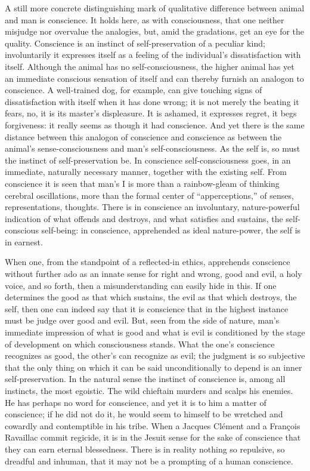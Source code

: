\documentclass[12pt]{book}
\begin{document}
A still more concrete distinguishing mark of qualitative difference between animal and man is
conscience. It holds here, as with consciousness, that one neither misjudge nor overvalue the
analogies, but, amid the gradations, get an eye for the quality. Conscience is an instinct of
self-preservation of a peculiar kind; involuntarily it expresses itself as a feeling of the
individual's dissatisfaction with itself. Although the animal has no self-consciousness, the
higher animal has yet an immediate conscious sensation of itself and can thereby furnish an
analogon to conscience. A well-trained dog, for example, can give touching signs of
dissatisfaction with itself when it has done wrong; it is not merely the beating it fears, no,
it is its master's displeasure. It is ashamed, it expresses regret, it begs forgiveness: it
really seems as though it had conscience. And yet there is the same distance between this
analogon of conscience and conscience as between the animal's sense-consciousness and man's
self-consciousness. As the self is, so must the instinct of self-preservation be. In
conscience self-consciousness goes, in an immediate, naturally necessary manner, together with
the existing self. From conscience it is seen that man's I is more than a rainbow-gleam of
thinking cerebral oscillations, more than the formal center of ``apperceptions,'' of senses,
representations, thoughts. There is in conscience an involuntary, nature-powerful indication
of what offends and destroys, and what satisfies and sustains, the self-conscious self-being:
in conscience, apprehended as ideal nature-power, the self is in earnest.

When one, from the standpoint of a reflected-in ethics, apprehends conscience without further
ado as an innate sense for right and wrong, good and evil, a holy voice, and so forth, then a
misunderstanding can easily hide in this. If one determines the good as that which sustains,
the evil as that which destroys, the self, then one can indeed say that it is conscience that
in the highest instance must be judge over good and evil. But, seen from the side of nature,
man's immediate impression of what is good and what is evil is conditioned by the stage of
development on which consciousness stands. What the one's conscience recognizes as good, the
other's can recognize as evil; the judgment is so subjective that the only thing on which it
can be said unconditionally to depend is an inner self-preservation. In the natural sense the
instinct of conscience is, among all instincts, the most egoistic. The wild chieftain murders
and scalps his enemies. He has perhaps no word for conscience, and yet it is to him a matter
of conscience; if he did not do it, he would seem to himself to be wretched and cowardly and
contemptible in his tribe. When a Jacques Clément and a François Ravaillac commit regicide, it
is in the Jesuit sense for the sake of conscience that they can earn eternal blessedness. There
is in reality nothing so repulsive, so dreadful and inhuman, that it may not be a prompting of
a human conscience.
\end{document}
